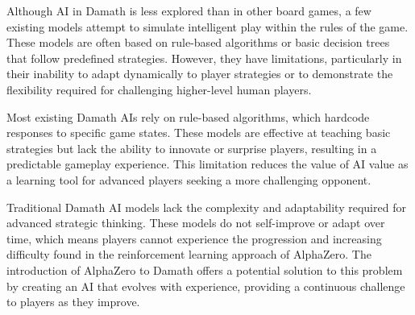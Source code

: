 Although AI in Damath is less explored than in other board games, a few existing models attempt to simulate intelligent play within the rules of the game. These models are often based on rule-based algorithms or basic decision trees that follow predefined strategies. However, they have limitations, particularly in their inability to adapt dynamically to player strategies or to demonstrate the flexibility required for challenging higher-level human players.

Most existing Damath AIs rely on rule-based algorithms, which hardcode responses to specific game states. These models are effective at teaching basic strategies but lack the ability to innovate or surprise players, resulting in a predictable gameplay experience. This limitation reduces the value of AI value as a learning tool for advanced players seeking a more challenging opponent.

Traditional Damath AI models lack the complexity and adaptability required for advanced strategic thinking. These models do not self-improve or adapt over time, which means players cannot experience the progression and increasing difficulty found in the reinforcement learning approach of AlphaZero. The introduction of AlphaZero to Damath offers a potential solution to this problem by creating an AI that evolves with experience, providing a continuous challenge to players as they improve.